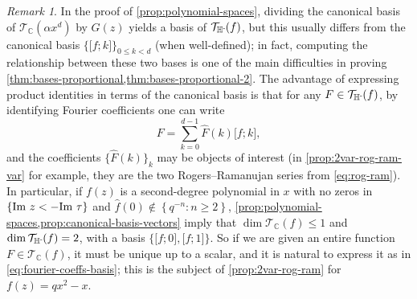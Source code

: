 \documentclass[reqno,11pt]{amsart}
\theoremstyle{definition}
\theoremstyle{remark}
\newtheorem*{remark}{Remark}
\numberwithin{equation}{section}
\newcommand{\C}{\mathbb{C}}
\newcommand{\Hminus}{{\mathbb{H}^{\textnormal{-}\hspace{-0.03cm}}}}
\newcommand{\mT}{\mathcal{T}}
\renewcommand{\Im}{\textnormal{Im}\ }
\newcommand{\vect}[2]{\big[{#1};{#2}\big]}
\renewcommand{\hat}{\widehat}
\begin{document}
\begin{remark}
In the proof of \cref{prop:polynomial-spaces}, dividing the canonical basis of $\mT_\C\left(\alpha x^d\right)$ by $G(z)$ yields a basis of $\mT_\Hminus(f)$, but this usually differs from the canonical basis $\{\vect{f}{k}\}_{0 \le k < d}$ (when well-defined); in fact, computing the relationship between these two bases is one of the main difficulties in proving \cref{thm:bases-proportional,thm:bases-proportional-2}. The advantage of expressing product identities in terms of the canonical basis is that for any $F \in \mT_\Hminus(f)$, by identifying Fourier coefficients one can write
\begin{equation} \label{eq:fourier-coeffs-basis}
    F = \sum_{k=0}^{d-1} \hat{F}(k) \vect{f}{k},
\end{equation}
and the coefficients $\{\hat{F}(k)\}_k$ may be objects of interest (in \cref{prop:2var-rog-ram-var} for example, they are the two Rogers--Ramanujan series from \cref{eq:rog-ram}). In particular, if $f(z)$ is a second-degree polynomial in $x$ with no zeros in $\{\Im z < -\Im \tau\}$ and $\hat{f}(0) \not\in \left\{q^{-n} : n \ge 2\right\}$, \cref{prop:polynomial-spaces,prop:canonical-basis-vectors} imply that $\dim \mT_\C(f) \le 1$ and $\dim \mT_\Hminus(f) = 2$, with a basis $\{\vect{f}{0}, \vect{f}{1}\}$. So if we are given an entire function $F \in \mT_\C(f)$, it must be unique up to a scalar, and it is natural to express it as in \cref{eq:fourier-coeffs-basis}; this is the subject of \cref{prop:2var-rog-ram} for $f(z) = qx^2 - x$.%
\end{remark} 
\end{document}
